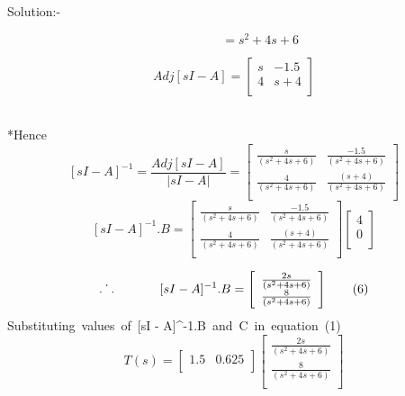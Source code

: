 \documentclass[journal,12pt,twocolumn]{IEEEtran}
\begin{document}
\begin{frame}{Solution:- }
\begin{frame}{}
\begin{frame}{}
 \[\;\;\;\;\;\;\;\;\;\;\;\;\;\;\;= s^2 + 4s+ 6 \tag{$3$}\]
  \vskip 0.00001cm
 
 
  
\end{frame}
\begin{frame}{}
\[Adj[sI - A] = \left[ {\begin{array}{cc}
   s & -1.5 \\
   4 & s+4 \\
  \end{array} } \right]\]
  
  \vskip 0.1cm
\\*Hence
 \[[sI - A]^{-1} = \frac{Adj[sI - A]}{|sI - A|} = \left[ {\begin{array}{cc}
   \frac{s}{(s^2 + 4s + 6)} & \frac{-1.5}{(s^2 + 4s + 6)} \\
   \frac{4}{(s^2 + 4s + 6)} & \frac{(s + 4)}{(s^2 + 4s + 6)} \\
  \end{array} } \right] \tag{$4$}\]
  \vskip 0.1cm
\[
  [sI - A]^{-1}.B = \left[ {\begin{array}{cc}
   \frac{s}{(s^2 + 4s + 6)} & \frac{-1.5}{(s^2 + 4s + 6)} \\
   \frac{4}{(s^2 + 4s + 6)} & \frac{(s + 4)}{(s^2 + 4s + 6)} \\
  \end{array} } \right]\left[ {\begin{array}{cc}
  
      4   \\
      0 \\
  \end{array} }\right] \tag{$5$}
  \]
  \vskip 0.1cm
\hspace{.5in}
\vskip 0.1cm

\end{frame}
\begin{frame}{}
\[
\dot{.\hspace{.095in}.}\hspace{.5in} [sI - A]^{-1}.B =  \left[ {\begin{array}{cc}
   \frac{2s}{(s^2 + 4s + 6)} \\
   \frac{8}{(s^2 + 4s + 6)} \\
  \end{array} } \right] \tag{$6$}\]
 \vskip 0.1cm 
 Substituting\, values\, of\, [sI - A]^{-1}.B\, and\, C\, in\, equation\, (1)
\vskip 0.1cm
\[ T(s) = \left[ {\begin{array}{cc}
   1.5 & 0.625 \\
  \end{array} }\right]\left[ {\begin{array}{cc}
   \frac{2s}{(s^2 + 4s + 6)} \\
   \frac{8}{(s^2 + 4s + 6)} \\
  \end{array} } \right] \tag{$7$}
\]


\end{frame}
\end{frame}
\end{frame}
\end{document}

